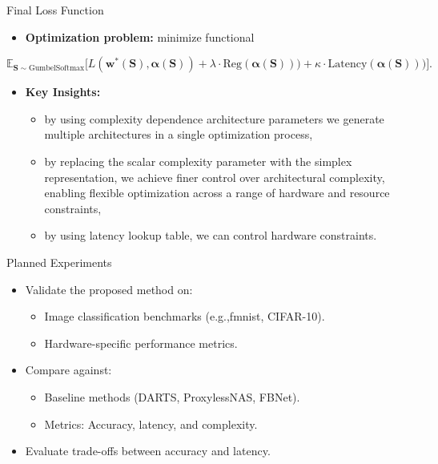\documentclass{beamer}
\begin{document}


\begin{frame}{Final Loss Function}
\begin{itemize}
    \item \textbf{Optimization problem:} minimize functional
\end{itemize}

    \[
    \mathbb{E}_{\boldsymbol{S} \sim \text{GumbelSoftmax}} \big[L(\boldsymbol{w}^*(\boldsymbol{S}), \boldsymbol{\alpha}(\boldsymbol{S})) + \lambda \cdot \text{Reg}(\boldsymbol{\alpha}(\boldsymbol{S}))) + \kappa \cdot \text{Latency}(\boldsymbol{\alpha}(\boldsymbol{S})))\big].
    \]
\begin{itemize}
    \item \textbf{Key Insights:}
    \begin{itemize}
        \item by using complexity dependence architecture parameters we generate multiple architectures in a single optimization process, 
        \item by replacing the scalar complexity parameter with the simplex representation, we achieve finer control over architectural complexity, enabling flexible optimization across a range of hardware and resource constraints,
        \item by using latency lookup table, we can control hardware constraints.
    \end{itemize}
\end{itemize}
\end{frame}



\begin{frame}{Planned Experiments}
\begin{itemize}
    \item Validate the proposed method on:
    \begin{itemize}
        \item Image classification benchmarks (e.g.,fmnist, CIFAR-10).
        \item Hardware-specific performance metrics.
    \end{itemize}
    \item Compare against:
    \begin{itemize}
        \item Baseline methods (DARTS, ProxylessNAS, FBNet).
        \item Metrics: Accuracy, latency, and complexity.
    \end{itemize}
    \item Evaluate trade-offs between accuracy and latency.
\end{itemize}
\end{frame}
\end{document}
